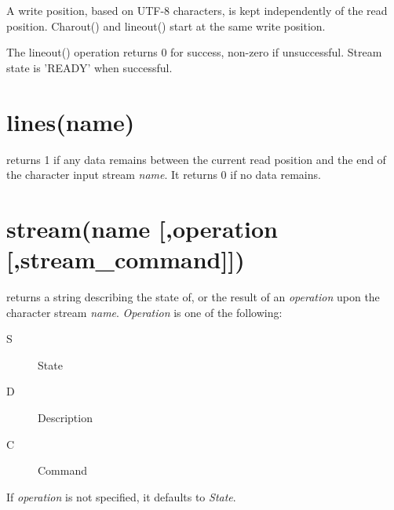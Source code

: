 A write position, based on UTF-8 characters, is kept independently of the read position.
Charout() and lineout() start at the same write position.

The lineout() operation returns 0 for success, non-zero if unsuccessful. Stream state is 'READY' when successful.

\section{lines(name)}
returns 1 if any data remains between the current read position and the end of the character input
stream \emph{name}. It returns 0 if no data remains.

\section{stream(name [,operation [,stream\_command{]]})}
returns a string describing the state of, or the result of an \emph{operation}
upon the character stream \emph{name}.
\emph{Operation} is one of the following:
\begin{description}
  \item[S] State
  \item[D] Description
  \item[C] Command
\end{description}
If \emph{operation} is not specified, it defaults to \emph{State}.


